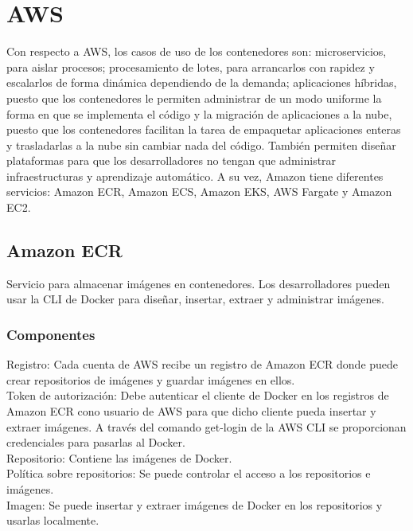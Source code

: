 \documentclass[english,runningheads,a4paper]{llncs}[2018/03/10]
\begin{document}
\section*{AWS}
Con respecto a AWS, los casos de uso de los contenedores son: microservicios, 
para aislar procesos; procesamiento de lotes, para arrancarlos con rapidez y 
escalarlos de forma dinámica dependiendo de la demanda; aplicaciones híbridas, 
puesto que los contenedores le permiten administrar de un modo uniforme la forma
en que se implementa el código y la migración de aplicaciones a la nube, puesto 
que los contenedores facilitan la tarea de empaquetar aplicaciones enteras y 
trasladarlas a la nube sin cambiar nada del código. También permiten diseñar 
plataformas para que los desarrolladores no tengan que administrar 
infraestructuras y aprendizaje automático. A su vez, Amazon tiene diferentes 
servicios: Amazon ECR, Amazon ECS, Amazon EKS, AWS Fargate y Amazon EC2.


\newpage
\subsection*{Amazon ECR}
Servicio para almacenar imágenes en contenedores. Los desarrolladores pueden 
usar la CLI de Docker para diseñar, insertar, extraer y administrar imágenes.

\subsubsection*{Componentes}
Registro: Cada cuenta de AWS recibe un registro de Amazon ECR donde puede crear 
repositorios de imágenes y guardar imágenes en ellos.\\
Token de autorización: Debe autenticar el cliente de Docker en los registros de 
Amazon ECR cono usuario de AWS para que dicho cliente pueda insertar y extraer 
imágenes. A través del comando get-login de la AWS CLI se proporcionan 
credenciales para pasarlas al Docker.\\
Repositorio: Contiene las imágenes de Docker.\\
Política sobre repositorios: Se puede controlar el acceso a los repositorios e 
imágenes. \\
Imagen: Se puede insertar y extraer imágenes de Docker en los repositorios y 
usarlas localmente.
\end{document}
